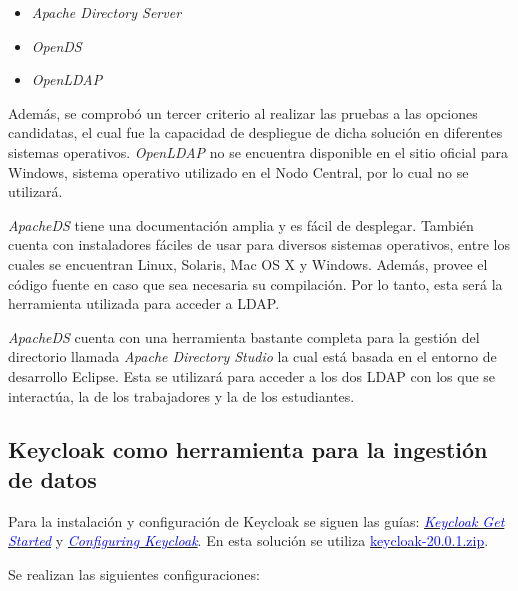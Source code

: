 \begin{itemize}
	\item \textit{Apache Directory Server}
	\item \textit{OpenDS}
	\item \textit{OpenLDAP}
\end{itemize}

Además, se comprobó un tercer criterio al realizar las pruebas a las opciones candidatas, el cual fue la capacidad de despliegue de dicha solución en diferentes sistemas operativos. \textit{OpenLDAP} no se encuentra disponible en el sitio oficial para Windows, sistema operativo utilizado en el Nodo Central, por lo cual no se utilizará. 

\textit{ApacheDS} tiene una documentación amplia y es fácil de desplegar. También cuenta con instaladores fáciles de usar para diversos sistemas operativos, entre los cuales se encuentran Linux, Solaris, Mac OS X y Windows. Además, provee el código fuente en caso que sea necesaria su compilación. Por lo tanto, esta será la herramienta utilizada para acceder a LDAP.

\textit{ApacheDS} cuenta con una herramienta bastante completa para la gestión del directorio llamada \textit{Apache Directory Studio} la cual está basada en el entorno de desarrollo Eclipse. Esta se utilizará para acceder a los dos LDAP con los que se interactúa, la de los trabajadores y la de los estudiantes.

\subsection{Keycloak como herramienta para la ingestión de datos} \label{keycloak-config}
%

Para la instalación y configuración de Keycloak se siguen las guías: \href{https://www.keycloak.org/getting-started/getting-started-zip}{\textcolor{blue}{\textit{Keycloak Get Started}}} y \href{https://www.keycloak.org/server/configuration}{\textit{\textcolor{blue}{Configuring Keycloak}}}. En esta solución se utiliza \href{https://github.com/keycloak/keycloak/releases/download/20.0.1/keycloak-20.0.1.zip}{\textcolor{blue}{keycloak-20.0.1.zip}}.

Se realizan las siguientes configuraciones:


